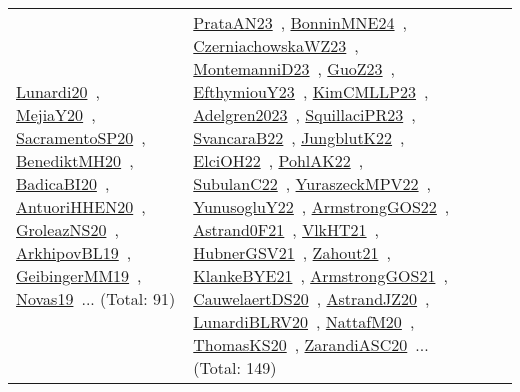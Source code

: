 {\begin{longtable}{lp{3cm}>{\raggedright\arraybackslash}p{6cm}>{\raggedright\arraybackslash}p{6cm}>{\raggedright\arraybackslash}p{8cm}}
\href{../works/Lunardi20.pdf}{Lunardi20}~\cite{Lunardi20}, \href{../works/MejiaY20.pdf}{MejiaY20}~\cite{MejiaY20}, \href{../works/SacramentoSP20.pdf}{SacramentoSP20}~\cite{SacramentoSP20}, \href{../works/BenediktMH20.pdf}{BenediktMH20}~\cite{BenediktMH20}, \href{../works/BadicaBI20.pdf}{BadicaBI20}~\cite{BadicaBI20}, \href{../works/AntuoriHHEN20.pdf}{AntuoriHHEN20}~\cite{AntuoriHHEN20}, \href{../works/GroleazNS20.pdf}{GroleazNS20}~\cite{GroleazNS20}, \href{../works/ArkhipovBL19.pdf}{ArkhipovBL19}~\cite{ArkhipovBL19}, \href{../works/GeibingerMM19.pdf}{GeibingerMM19}~\cite{GeibingerMM19}, \href{../works/Novas19.pdf}{Novas19}~\cite{Novas19}... (Total: 91) & \href{../works/PrataAN23.pdf}{PrataAN23}~\cite{PrataAN23}, \href{../works/BonninMNE24.pdf}{BonninMNE24}~\cite{BonninMNE24}, \href{../works/CzerniachowskaWZ23.pdf}{CzerniachowskaWZ23}~\cite{CzerniachowskaWZ23}, \href{../works/MontemanniD23.pdf}{MontemanniD23}~\cite{MontemanniD23}, \href{../works/GuoZ23.pdf}{GuoZ23}~\cite{GuoZ23}, \href{../works/EfthymiouY23.pdf}{EfthymiouY23}~\cite{EfthymiouY23}, \href{../works/KimCMLLP23.pdf}{KimCMLLP23}~\cite{KimCMLLP23}, \href{../works/Adelgren2023.pdf}{Adelgren2023}~\cite{Adelgren2023}, \href{../works/SquillaciPR23.pdf}{SquillaciPR23}~\cite{SquillaciPR23}, \href{../works/SvancaraB22.pdf}{SvancaraB22}~\cite{SvancaraB22}, \href{../works/JungblutK22.pdf}{JungblutK22}~\cite{JungblutK22}, \href{../works/ElciOH22.pdf}{ElciOH22}~\cite{ElciOH22}, \href{../works/PohlAK22.pdf}{PohlAK22}~\cite{PohlAK22}, \href{../works/SubulanC22.pdf}{SubulanC22}~\cite{SubulanC22}, \href{../works/YuraszeckMPV22.pdf}{YuraszeckMPV22}~\cite{YuraszeckMPV22}, \href{../works/YunusogluY22.pdf}{YunusogluY22}~\cite{YunusogluY22}, \href{../works/ArmstrongGOS22.pdf}{ArmstrongGOS22}~\cite{ArmstrongGOS22}, \href{../works/Astrand0F21.pdf}{Astrand0F21}~\cite{Astrand0F21}, \href{../works/VlkHT21.pdf}{VlkHT21}~\cite{VlkHT21}, \href{../works/HubnerGSV21.pdf}{HubnerGSV21}~\cite{HubnerGSV21}, \href{../works/Zahout21.pdf}{Zahout21}~\cite{Zahout21}, \href{../works/KlankeBYE21.pdf}{KlankeBYE21}~\cite{KlankeBYE21}, \href{../works/ArmstrongGOS21.pdf}{ArmstrongGOS21}~\cite{ArmstrongGOS21}, \href{../works/CauwelaertDS20.pdf}{CauwelaertDS20}~\cite{CauwelaertDS20}, \href{../works/AstrandJZ20.pdf}{AstrandJZ20}~\cite{AstrandJZ20}, \href{../works/LunardiBLRV20.pdf}{LunardiBLRV20}~\cite{LunardiBLRV20}, \href{../works/NattafM20.pdf}{NattafM20}~\cite{NattafM20}, \href{../works/ThomasKS20.pdf}{ThomasKS20}~\cite{ThomasKS20}, \href{../works/ZarandiASC20.pdf}{ZarandiASC20}~\cite{ZarandiASC20}... (Total: 149)\\

\end{longtable}}
